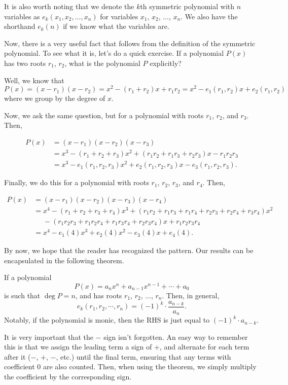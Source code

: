 \documentclass[11pt]{scrartcl}
\begin{document}
It is also worth noting that we denote the $k$th symmetric polynomial with $n$ variables as $e_k\left(x_1, x_2, \dots, x_n\right)$ for variables $x_1$, $x_2$, $\dots$, $x_n$. We also have the shorthand $e_k(n)$ if we know what the variables are.

Now, there is a very useful fact that follows from the definition of the symmetric polynomial. To see what it is, let's do a quick exercise. If a polynomial $P(x)$ has two roots $r_1$, $r_2$, what is the polynomial $P$ explicitly?

Well, we know that \[P(x) = (x-r_1)(x-r_2) = x^2-(r_1+r_2)x+r_1r_2 = x^2-e_1(r_1, r_2)x+e_2(r_1, r_2)\] where we group by the degree of $x$.

Now, we ask the same question, but for a polynomial with roots $r_1$, $r_2$, and $r_3$. Then,

\begin{align*}
P(x) &= (x-r_1)(x-r_2)(x-r_3) \\
&= x^3-(r_1+r_2+r_3)x^2+(r_1r_2+r_1r_3+r_2r_3)x-r_1r_2r_3 \\
&= x^3-e_1(r_1, r_2, r_3)x^2+e_2(r_1, r_2, r_3)x-e_3(r_1, r_2, r_3).
\end{align*}

Finally, we do this for a polynomial with roots $r_1$, $r_2$, $r_3$, and $r_4$. Then,

\begin{align*}
P(x) &= (x-r_1)(x-r_2)(x-r_3)(x-r_4) \\
&= x^4-(r_1+r_2+r_3+r_4)x^3+(r_1r_2+r_1r_3+r_1r_4+r_2r_3+r_2r_4+r_3r_4)x^2 \\
&\phantom{=} -(r_1r_2r_3+r_1r_2r_4+r_1r_3r_4+r_2r_3r_4)x+r_1r_2r_3r_4 \\
&= x^4-e_1(4)x^3+e_2(4)x^2-e_3(4)x+e_4(4).
\end{align*}

By now, we hope that the reader has recognized the pattern. Our results can be encapsulated in the following theorem.

\begin{theorem*}
If a polynomial \[P(x) = a_nx^n+a_{n-1}x^{n-1}+\cdots+a_0\] is such that $\deg P = n$, and has roots $r_1$, $r_2$, $\dots$, $r_n$. Then, in general, \[e_k(r_1, r_2, \cdots, r_n) = (-1)^k\cdot \dfrac{a_{n-k}}{a_n}.\] Notably, if the polynomial is monic, then the RHS is just equal to $(-1)^k\cdot a_{n-k}$.
\end{theorem*}

It is very important that the $-$ sign isn't forgotten. An easy way to remember this is that we assign the leading term a sign of $+$, and alternate for each term after it ($-$, $+$, $-$, etc.) until the final term, ensuring that any terms with coefficient $0$ are also counted. Then, when using the theorem, we simply multiply the coefficient by the corresponding sign.
\end{document}
